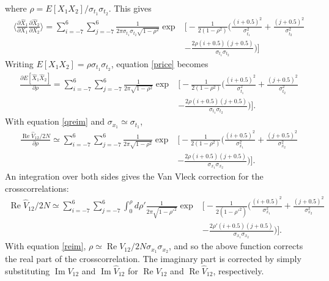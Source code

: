 \documentclass[11pt]{article}
\renewcommand{\Re}{\operatorname{Re}}
\renewcommand{\Im}{\operatorname{Im}}
\begin{document}
where $\rho=E[X_1 X_2]/\sigma_{t_1}\sigma_{t_2}$. This gives
\begin{equation}
\begin{split}
\Big\langle\frac{\partial \hat X_1}{\partial X_1}\frac{\partial \hat X_2}{\partial X_2}\Big\rangle=\sum_{i=-7}^{6}\sum_{j=-7}^{6}\frac{1}{2\pi\sigma_{t_1}\sigma_{t_2}\sqrt{1-\rho^2}}\exp&\Big[-\frac{1}{2(1-\rho^2)}\Big(\frac{(i+0.5)^2}{\sigma_{t_1}^2}+\frac{(j+0.5)^2}{\sigma_{t_2}^2}\\
&-\frac{2\rho (i+0.5)(j+0.5)}{\sigma_{t_1}\sigma_{t_2}}\Big)\Big]
\end{split}
\end{equation}
Writing $E[X_1 X_2]=\rho \sigma_{t_1}\sigma_{t_2}$, equation \ref{price} becomes
\begin{equation}
\begin{split}
\frac{\partial E[\hat X_1 \hat X_2]}{\partial \rho}=\sum_{i=-7}^{6}\sum_{j=-7}^{6}\frac{1}{2\pi\sqrt{1-{\rho}^2}}\exp&\Big[-\frac{1}{2(1-{\rho}^2)}\Big(\frac{(i+0.5)^2}{\sigma_{t_1}^2}+\frac{(j+0.5)^2}{\sigma_{t_2}^2}\\
&-\frac{2{\rho} (i+0.5)(j+0.5)}{\sigma_{t_1}\sigma_{t_2}}\Big)\Big].
\end{split}
\end{equation}
With equation \eqref{qreim} and $\sigma_{x_1}\simeq\sigma_{t_1}$,
\begin{equation}
\begin{split}
\frac{\Re \hat V_{12}/2N}{\partial \rho}\simeq\sum_{i=-7}^{6}\sum_{j=-7}^{6}\frac{1}{2\pi\sqrt{1-{\rho}^2}}\exp&\Big[-\frac{1}{2(1-{\rho}^2)}\Big(\frac{(i+0.5)^2}{\sigma_{x_1}^2}+\frac{(j+0.5)^2}{\sigma_{x_2}^2}\\
&-\frac{2{\rho} (i+0.5)(j+0.5)}{\sigma_{x_1}\sigma_{x_2}}\Big)\Big].
\end{split}
\end{equation}
An integration over both sides gives the Van Vleck correction for the crosscorrelations:
\begin{equation}
\label{crosscorr}
\boxed{
\begin{split}
\Re \hat V_{12}/2N\simeq\sum_{i=-7}^{6}\sum_{j=-7}^{6}\int_0^\rho d{\rho'}\frac{1}{2\pi\sqrt{1-{\rho'}^2}}\exp&\Big[-\frac{1}{2(1-{\rho'}^2)}\Big(\frac{(i+0.5)^2}{\sigma_{x_1}^2}+\frac{(j+0.5)^2}{\sigma_{x_2}^2}\\
&-\frac{2{\rho'} (i+0.5)(j+0.5)}{\sigma_{x_1}\sigma_{x_2}}\Big)\Big].
\end{split}}
\end{equation}
With equation \eqref{reim}, $\rho \simeq \Re V_{12}/2N\sigma_{x_1}\sigma_{x_2}$, and so the above function corrects the real part of the crosscorrelation. The imaginary part is corrected by simply substituting $\Im V_{12}$ and $\Im \hat V_{12}$ for $\Re V_{12}$ and $\Re \hat V_{12}$, respectively.
\end{document}

